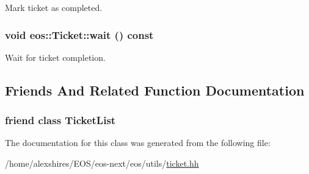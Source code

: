 Mark ticket as completed. \hypertarget{classeos_1_1Ticket_ab3dc3b4e907527f14d54a49269e8174d}{
\subsubsection[{wait}]{\setlength{\rightskip}{0pt plus 5cm}void eos::Ticket::wait () const}}
\label{classeos_1_1Ticket_ab3dc3b4e907527f14d54a49269e8174d}


Wait for ticket completion. 

\subsection{Friends And Related Function Documentation}
\hypertarget{classeos_1_1Ticket_ac0aa77ee461a5d61db873f8c71163cb3}{
\subsubsection[{TicketList}]{\setlength{\rightskip}{0pt plus 5cm}friend class {\bf TicketList}}}
\label{classeos_1_1Ticket_ac0aa77ee461a5d61db873f8c71163cb3}


The documentation for this class was generated from the following file:\begin{DoxyCompactItemize}
\item 
/home/alexshires/EOS/eos-\/next/eos/utils/\hyperlink{ticket_8hh}{ticket.hh}\end{DoxyCompactItemize}
